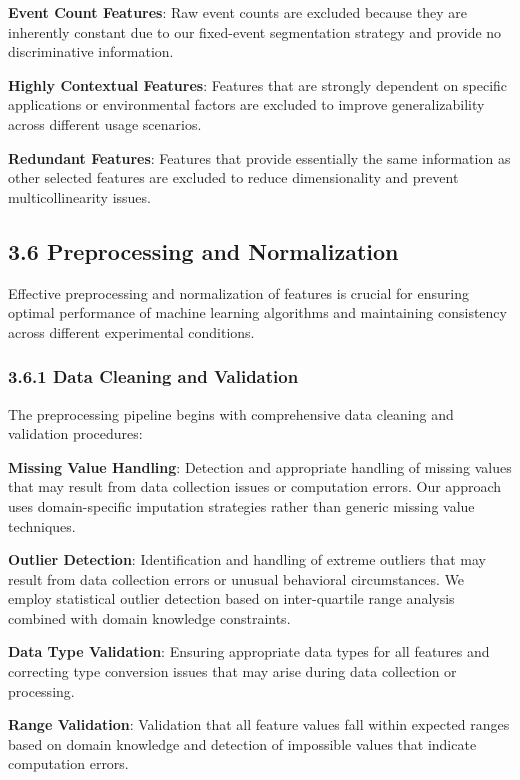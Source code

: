 \documentclass[
  11pt,
  a4paper,
]{article}
\begin{document}
\textbf{Event Count Features}: Raw event counts are excluded because
they are inherently constant due to our fixed-event segmentation
strategy and provide no discriminative information.

\textbf{Highly Contextual Features}: Features that are strongly
dependent on specific applications or environmental factors are excluded
to improve generalizability across different usage scenarios.

\textbf{Redundant Features}: Features that provide essentially the same
information as other selected features are excluded to reduce
dimensionality and prevent multicollinearity issues.

\subsection{3.6 Preprocessing and
Normalization}\label{preprocessing-and-normalization}

Effective preprocessing and normalization of features is crucial for
ensuring optimal performance of machine learning algorithms and
maintaining consistency across different experimental conditions.

\subsubsection{3.6.1 Data Cleaning and
Validation}\label{data-cleaning-and-validation}

The preprocessing pipeline begins with comprehensive data cleaning and
validation procedures:

\textbf{Missing Value Handling}: Detection and appropriate handling of
missing values that may result from data collection issues or
computation errors. Our approach uses domain-specific imputation
strategies rather than generic missing value techniques.

\textbf{Outlier Detection}: Identification and handling of extreme
outliers that may result from data collection errors or unusual
behavioral circumstances. We employ statistical outlier detection based
on inter-quartile range analysis combined with domain knowledge
constraints.

\textbf{Data Type Validation}: Ensuring appropriate data types for all
features and correcting type conversion issues that may arise during
data collection or processing.

\textbf{Range Validation}: Validation that all feature values fall
within expected ranges based on domain knowledge and detection of
impossible values that indicate computation errors.
\end{document}
